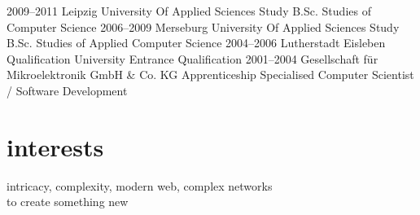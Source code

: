 \documentclass[]{friggeri-cv}
\begin{document}
\begin{entrylist}
  \entry
    {2009–2011}
    {Leipzig University Of Applied Sciences}
    {Study B.Sc.}
    {Studies of Computer Science}
  \entry
    {2006–2009}
    {Merseburg University Of Applied Sciences}
    {Study B.Sc.}
    {Studies of Applied Computer Science}
  \entry
    {2004–2006}
    {Lutherstadt Eisleben}
    {Qualification}
    {University Entrance Qualification}
  \entry
    {2001–2004}
    {Gesellschaft für Mikroelektronik GmbH \& Co. KG}
    {Apprenticeship}
    {Specialised Computer Scientist / Software Development}
\end{entrylist}


\section{interests}

intricacy, complexity, modern web, complex networks\\
to create something new
\end{document}
